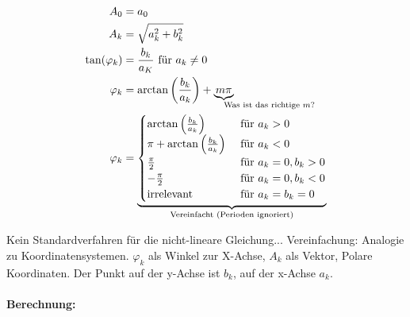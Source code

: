 \begin{align*}
A_0 &= a_0 \\
A_k &= \sqrt{a_k^2 + b_k^2} \\
\tan(\varphi_k) &= \frac{b_k}{a_K} \text{ für } a_k \neq 0 \\
\varphi_k &= \arctan\left(\frac{b_k}{a_k}\right) + \underbrace{m \pi}_{\mathrlap{\text{Was ist das richtige } m \text{?}}} \\
\varphi_k &= \underbrace{\begin{cases}
\arctan\left( \frac{b_k}{a_k} \right) & \text{ für } a_k > 0 \\
\pi + \arctan\left( \frac{b_k}{a_k} \right) & \text{ für } a_k < 0 \\
\frac{\pi}{2} & \text{ für } a_k = 0, b_k > 0 \\
-\frac{\pi}{2} & \text{ für } a_k = 0, b_k < 0 \\
\text{irrelevant} & \text{ für } a_k = b_k = 0 \\
\end{cases}}_{\text{Vereinfacht (Perioden ignoriert)}}
\end{align*}

Kein Standardverfahren für die nicht-lineare Gleichung... Vereinfachung: Analogie zu Koordinatensystemen. $\varphi_k$ als Winkel zur X-Achse, $A_k$ als Vektor, Polare Koordinaten. Der Punkt auf der y-Achse ist $b_k$, auf der x-Achse $a_k$.



\paragraph{Berechnung:}

